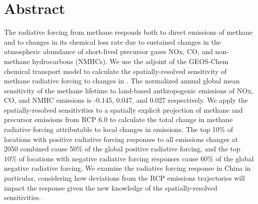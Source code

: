 \section*{Abstract}

The radiative forcing from methane responds both to direct emissions of methane and to changes in its chemical loss rate due to sustained changes in the atmospheric abundance of short-lived precursor gases NOx, CO, and non-methane hydrocarbons (NMHCs). We use the adjoint of the GEOS-Chem chemical transport model to calculate the spatially-resolved sensitivity of methane radiative forcing to changes in \color{anthropogenic sources of precursor emissions}. The normalized annual global mean sensitivity of the methane lifetime to land-based anthropogenic emissions of NOx, CO, and NMHC emissions is -0.145, 0.047, and 0.027 respectively. We apply the spatially-resolved sensitivities to a spatially explicit projection of methane and precursor emissions from RCP 6.0 to calculate the total change in methane radiative forcing attributable to local changes in emissions. The top 10\% of locations with positive radiative forcing responses to all emissions changes at 2050 combined cause 50\% of the global positive radiative forcing, and the top 10\% of locations with negative radiative forcing responses cause 60\% of the global negative radiative forcing. We examine the radiative forcing response in China in particular, considering how deviations from the RCP emissions trajectories will impact the response given the new knowledge of the spatially-resolved sensitivities.